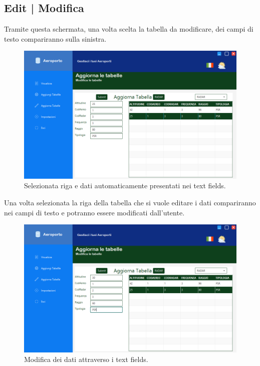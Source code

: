 \subsection{Edit | Modifica}

\textsf{\small Tramite questa schermata, una volta scelta la tabella da modificare, dei campi di testo compariranno sulla sinistra.}\\

\begin{figure}[H] 
	\centering
	\includegraphics[width=1\textwidth, height=1\textheight, keepaspectratio]{./img/Applicativo/edit_table.png}
	\caption{Selezionata riga e dati automaticamente presentati nei text fields.}
	\label{fig:edit_table1}
\end{figure}

\textsf{\small Una volta selezionata la riga della tabella che si vuole editare i dati compariranno nei campi di testo e potranno essere modificati dall'utente.}\\

\begin{figure}[H] 
	\centering
	\includegraphics[width=1\textwidth, height=1\textheight, keepaspectratio]{./img/Applicativo/edit_table2.png}
	\caption{Modifica dei dati attraverso i text fields.}
	\label{fig:edit_table2}
\end{figure}

